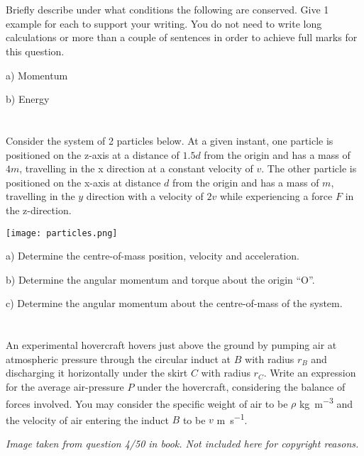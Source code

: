 \section{}

Briefly describe under what conditions the following are conserved. Give 1 example for each to support your writing. You do not need to write long calculations or more than a couple of sentences in order to achieve full marks for this question.

a) Momentum

b) Energy




\section{}

Consider the system of 2 particles below. At a given instant, one particle is positioned on the z-axis at a distance of $1.5d$ from the origin and has a mass of $4m$, travelling in the x direction at a constant velocity of $v$. The other particle is positioned on the x-axis at distance $d$ from the origin and has a mass of $m$, travelling in the $y$ direction with a velocity of $2v$ while experiencing a force $F$ in the z-direction.

\texttt{[image: particles.png]}

a) Determine the centre-of-mass position, velocity and acceleration.

b) Determine the angular momentum and torque about the origin ``O''.

c) Determine the angular momentum about the centre-of-mass of the system.




\section{}
An experimental hovercraft hovers just above the ground by pumping air at atmospheric pressure through the circular induct at $B$ with radius $r_B$ and discharging it horizontally under the skirt $C$ with radius $r_C$. Write an expression for the average air-pressure $P$ under the hovercraft, considering the balance of forces involved. You may consider the specific weight of air to be $\rho$ \si{\kg\per\cubic\meter} and the velocity of air entering the induct $B$ to be $v$ \si{\meter\per\second}.

\emph{Image taken from question 4/50 in book. Not included here for copyright reasons.}




